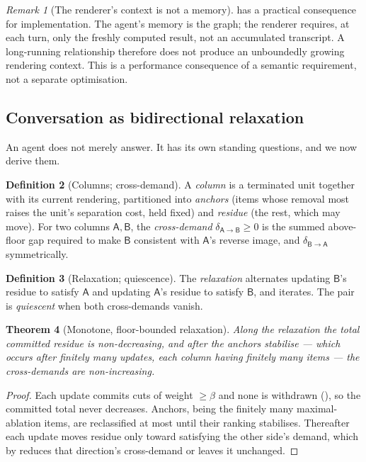 \documentclass[11pt,a4paper]{article}
\theoremstyle{clstyle}
\newtheorem{theorem}{Theorem}[section]
\theoremstyle{definition}
\newtheorem{definition}[theorem]{Definition}
\theoremstyle{remark}
\newtheorem{remark}[theorem]{Remark}
\newcommand{\flo}{\beta}
\newcommand{\dem}{\delta}
\newcommand{\colA}{\mathsf{A}}
\newcommand{\colB}{\mathsf{B}}
\begin{document}
\begin{remark}[The renderer's context is not a memory]
\label{rem:context}
 has a practical consequence for implementation. The
agent's memory is the graph; the renderer requires, at each turn, only the
freshly computed result, not an accumulated transcript. A long-running
relationship therefore does not produce an unboundedly growing rendering
context. This is a performance consequence of a semantic requirement, not a
separate optimisation.
\end{remark}

\subsection{Conversation as bidirectional relaxation}
\label{sec:conversation}

An agent does not merely answer. It has its own standing questions, and we
now derive them.

\begin{definition}[Columns; cross-demand]
\label{def:columns}
A \emph{column} is a terminated unit together with its current rendering,
partitioned into \emph{anchors} (items whose removal most raises the unit's
separation cost, held fixed) and \emph{residue} (the rest, which may move).
For two columns $\colA,\colB$, the \emph{cross-demand}
$\dem_{\colA\to\colB}\ge0$ is the summed above-floor gap required to make
$\colB$ consistent with $\colA$'s reverse image, and $\dem_{\colB\to\colA}$
symmetrically.
\end{definition}

\begin{definition}[Relaxation; quiescence]
\label{def:relax}
The \emph{relaxation} alternates updating $\colB$'s residue to satisfy
$\colA$ and updating $\colA$'s residue to satisfy $\colB$, and iterates. The
pair is \emph{quiescent} when both cross-demands vanish.
\end{definition}

\begin{theorem}[Monotone, floor-bounded relaxation]
\label{thm:relax-mono}
Along the relaxation the total committed residue is non-decreasing, and after
the anchors stabilise --- which occurs after finitely many updates, each
column having finitely many items --- the cross-demands are non-increasing.
\end{theorem}

\begin{proof}
Each update commits cuts of weight $\ge\flo$ and none is withdrawn
(), so the committed total never decreases. Anchors, being
the finitely many maximal-ablation items, are reclassified at most until
their ranking stabilises. Thereafter each update moves residue only toward
satisfying the other side's demand, which by  reduces that
direction's cross-demand or leaves it unchanged.
\end{proof}
\end{document}
